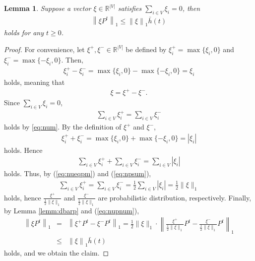 \documentclass[letter, 11pt]{article}
\newcommand{\1}{\mbox{1}\hspace{-0.25em}\mbox{l}}
\newtheorem{lemma}[theorem]{Lemma}
\begin{document}
\begin{lemma}
\label{lemm:dbarineq}
Suppose a vector $\xi\in \mathbb{R}^{|V|}$ satisfies $\sum_{i\in V}\xi_i=0$, then
\begin{eqnarray*}
\left \|\xi P^t \right \|_{1}\leq \left \|\xi \right \|_{1}\bar{h}(t)
\end{eqnarray*}
holds for any $t\geq 0$. 
\end{lemma} 
\begin{proof}
For convenience, let $\xi^+, \xi^-\in \mathbb{R}^{|V|}$ be defined by $\xi^+_i=\max\{\xi_i, 0\}$ and $\xi^-_i=\max\{-\xi_i, 0\}$. 
Then, 
\begin{eqnarray}
\label{eq:num}
\xi^+_i-\xi^-_i=\max\{\xi_i, 0\}-\max\{-\xi_i, 0\}=\xi_i
\end{eqnarray}
holds, meaning that 
\begin{eqnarray}
\label{eq:nupnum}
\xi=\xi^+-\xi^-. 
\end{eqnarray}
Since $\sum_{i\in V}\xi_i=0$, 
\begin{eqnarray}
\label{eq:nueqpm}
\sum_{i\in V}\xi^+_i=\sum_{i\in V}\xi^-_i
\end{eqnarray}
holds by \eqref{eq:num}. By the definition of $\xi^+$ and $\xi^-$, 
\begin{eqnarray*}
\xi^+_i+\xi^-_i=\max\{\xi_i, 0\}+\max\{-\xi_i, 0\}=|\xi_i|
\end{eqnarray*}
holds. Hence
\begin{eqnarray}
\label{eq:npsum}
\sum_{i\in V}\xi^+_i+\sum_{i\in V}\xi^-_i=\sum_{i\in V}|\xi_i|
\end{eqnarray}
holds. 
Thus, by (\ref{eq:nueqpm}) and (\ref{eq:npsum}), 
\begin{eqnarray}
\label{eq:vpvmv}
\sum_{i\in V}\xi^+_i=\sum_{i\in V}\xi^-_i=\frac{1}{2}\sum_{i\in V}|\xi_i|=\frac{1}{2}\|\xi\|_{1}
\end{eqnarray}
holds, hence $\frac{\xi^+}{\frac{1}{2}\|\xi\|_{1}}$ and $\frac{\xi^-}{\frac{1}{2}\|\xi\|_{1}}$ are probabilistic distribution, respectively. 
Finally, by Lemma \ref{lemm:dbarp} and (\ref{eq:nupnum}), 
\begin{eqnarray*}
\left \|\xi P^t \right \|_{1}
&=&\left \|\xi^+ P^t-\xi^- P^t\right \|_{1}
=\frac{1}{2}\|\xi\|_{1} \cdotp \left \| \frac{\xi^+}{\frac{1}{2}\|\xi\|_{1}} P^t-\frac{\xi^-}{\frac{1}{2}\|\xi\|_{1}} P^t \right \|_{1}\\
&\leq &\left \|\xi \right \|_{1}\bar{h}(t)
\end{eqnarray*}
 holds, and we obtain the claim. 
\end{proof}
\end{document}
